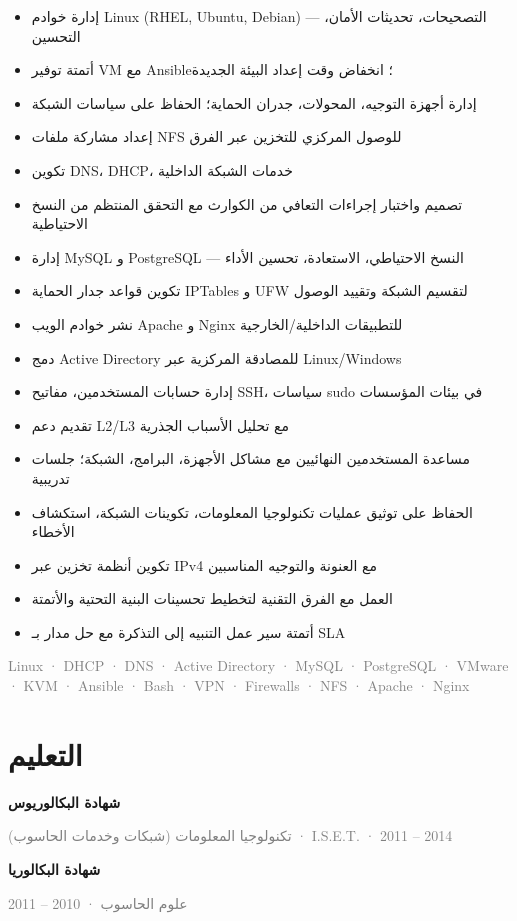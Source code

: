 \documentclass[10pt,a4paper]{article}
\newcommand{\tagline}[1]{\textcolor{graytext}{\small #1}\par}
\begin{document}
\begin{itemize}
  \item إدارة خوادم Linux (RHEL, Ubuntu, Debian) — التصحيحات، تحديثات الأمان، التحسين
  \item أتمتة توفير VM مع Ansible؛ انخفاض وقت إعداد البيئة الجديدة
  \item إدارة أجهزة التوجيه، المحولات، جدران الحماية؛ الحفاظ على سياسات الشبكة
  \item إعداد مشاركة ملفات NFS للوصول المركزي للتخزين عبر الفرق
  \item تكوين DNS، DHCP، خدمات الشبكة الداخلية
  \item تصميم واختبار إجراءات التعافي من الكوارث مع التحقق المنتظم من النسخ الاحتياطية
  \item إدارة MySQL و PostgreSQL — النسخ الاحتياطي، الاستعادة، تحسين الأداء
  \item تكوين قواعد جدار الحماية IPTables و UFW لتقسيم الشبكة وتقييد الوصول
  \item نشر خوادم الويب Apache و Nginx للتطبيقات الداخلية/الخارجية
  \item دمج Active Directory للمصادقة المركزية عبر Linux/Windows
  \item إدارة حسابات المستخدمين، مفاتيح SSH، سياسات sudo في بيئات المؤسسات
  \item تقديم دعم L2/L3 مع تحليل الأسباب الجذرية
  \item مساعدة المستخدمين النهائيين مع مشاكل الأجهزة، البرامج، الشبكة؛ جلسات تدريبية
  \item الحفاظ على توثيق عمليات تكنولوجيا المعلومات، تكوينات الشبكة، استكشاف الأخطاء
  \item تكوين أنظمة تخزين عبر IPv4 مع العنونة والتوجيه المناسبين
  \item العمل مع الفرق التقنية لتخطيط تحسينات البنية التحتية والأتمتة
  \item أتمتة سير عمل التنبيه إلى التذكرة مع حل مدار بـ SLA
\end{itemize}
\tagline{Linux · DHCP · DNS · Active Directory · MySQL · PostgreSQL · VMware · KVM · Ansible · Bash · VPN · Firewalls · NFS · Apache · Nginx}
\vspace{1pt}
\section*{التعليم}
\textbf{شهادة البكالوريوس}\par
\tagline{تكنولوجيا المعلومات (شبكات وخدمات الحاسوب) · I.S.E.T. · 2011 – 2014}
\textbf{شهادة البكالوريا}\par
\tagline{علوم الحاسوب · 2010 – 2011}
\end{document}

